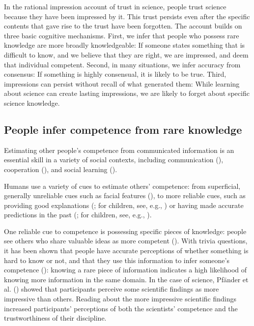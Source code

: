 \documentclass[
  jou,
  floatsintext,
  longtable,
  nolmodern,
  notxfonts,
  notimes,
  colorlinks=true,linkcolor=blue,citecolor=blue,urlcolor=blue]{apa7}
\begin{document}
In the rational impression account of trust in science, people trust
science because they have been impressed by it. This trust persists even
after the specific contents that gave rise to the trust have been
forgotten. The account builds on three basic cognitive mechanisms.
First, we infer that people who possess rare knowledge are more broadly
knowledgeable: If someone states something that is difficult to know,
and we believe that they are right, we are impressed, and deem that
individual competent. Second, in many situations, we infer accuracy from
consensus: If something is highly consensual, it is likely to be true.
Third, impressions can persist without recall of what generated them:
While learning about science can create lasting impressions, we are
likely to forget about specific science knowledge.

\subsection{People infer competence from rare
knowledge}\label{people-infer-competence-from-rare-knowledge}

Estimating other people's competence from communicated information is an
essential skill in a variety of social contexts, including communication
(),
cooperation (), and social learning
().

Humans use a variety of cues to estimate others' competence: from
superficial, generally unreliable cues such as facial features
(), to more reliable cues, such as providing good explanations
(;
for children, see, e.g.,
) or having made accurate predictions in the past
(; for children, see, e.g.,
).

One reliable cue to competence is possessing specific pieces of
knowledge: people see others who share valuable ideas as more competent
(). With trivia
questions, it has been shown that people have accurate perceptions of
whether something is hard to know or not, and that they use this
information to infer someone's competence
():
knowing a rare piece of information indicates a high likelihood of
knowing more information in the same domain. In the case of science,
Pfänder et al.
()
showed that participants perceive some scientific findings as more
impressive than others. Reading about the more impressive scientific
findings increased participants' perceptions of both the scientists'
competence and the trustworthiness of their discipline.
\end{document}
